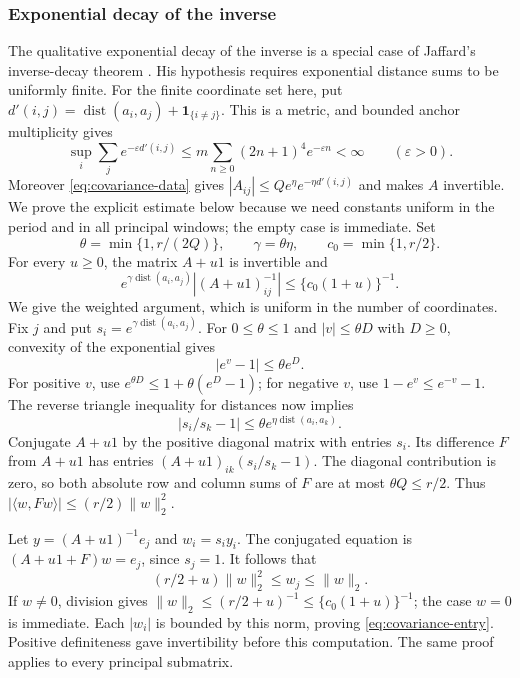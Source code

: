 \subsubsection{Exponential decay of the inverse}
The qualitative exponential decay of the inverse is a special case of
Jaffard's inverse-decay theorem \cite[Proposition~2, p.~464]{Jaffard}. His hypothesis requires exponential distance sums to be
uniformly finite. For the finite coordinate set here, put
$d'(i,j)=\operatorname{dist}(a_i,a_j)+\mathbf1_{\{i\ne j\}}$.
This is a metric, and bounded anchor multiplicity gives
\[
 \sup_i\sum_j e^{-\varepsilon d'(i,j)}
 \le m\sum_{n\ge0}(2n+1)^4e^{-\varepsilon n}<\infty
 \qquad(\varepsilon>0).
\]
Moreover \eqref{eq:covariance-data} gives
$|A_{ij}|\le Qe^\eta e^{-\eta d'(i,j)}$ and makes $A$ invertible.
We prove the explicit estimate below because we need constants uniform
in the period and in all principal windows; the empty case is immediate.
Set
\[
 \theta=\min\{1,r/(2Q)\},\qquad \gamma=\theta\eta,
 \qquad c_0=\min\{1,r/2\}.
\]
For every $u\ge0$, the matrix $A+u1$ is invertible and
\begin{equation}\label{eq:covariance-entry}
 e^{\gamma\operatorname{dist}(a_i,a_j)}
       |(A+u1)^{-1}_{ij}|\le\{c_0(1+u)\}^{-1}.
\end{equation}
We give the weighted argument, which is uniform in the number of
coordinates. Fix $j$ and put
$s_i=e^{\gamma\operatorname{dist}(a_i,a_j)}$.
For $0\le\theta\le1$ and $|v|\le\theta D$ with $D\ge0$,
convexity of the exponential gives
\[
 |e^v-1|\le\theta e^D.
\]
For positive $v$, use
$e^{\theta D}\le1+\theta(e^D-1)$; for negative $v$, use
$1-e^v\le e^{-v}-1$. The reverse triangle inequality for
distances now implies
\[
 |s_i/s_k-1|\le\theta e^{\eta\operatorname{dist}(a_i,a_k)}.
\]
Conjugate $A+u1$ by the positive diagonal matrix with entries
$s_i$. Its difference $F$ from $A+u1$ has entries
$(A+u1)_{ik}(s_i/s_k-1)$. The diagonal contribution is zero,
so both absolute row and column sums of $F$ are at most
$\theta Q\le r/2$. Thus
$|\langle w,Fw\rangle|\le(r/2)\|w\|_2^2$.

Let $y=(A+u1)^{-1}e_j$ and $w_i=s_i y_i$. The conjugated
equation is $(A+u1+F)w=e_j$, since $s_j=1$.
It follows that
\[
 (r/2+u)\|w\|_2^2\le w_j
 \le\|w\|_2.
\]
If $w\ne0$, division gives
$\|w\|_2\le(r/2+u)^{-1}\le\{c_0(1+u)\}^{-1}$;
the case $w=0$ is immediate. Each $|w_i|$ is bounded by this
norm, proving \eqref{eq:covariance-entry}. Positive definiteness
gave invertibility before this computation. The same proof applies
to every principal submatrix.

